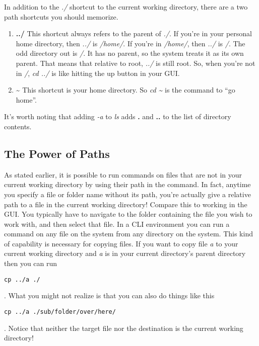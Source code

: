 \documentclass[nobib]{tufte-handout}
\begin{document}
In addition to the \textit{./} shortcut to the current working directory, there are a two path shortcuts you should memorize.
\begin{enumerate}
\item \textbf{../}  \newline
This shortcut always refers to the parent of \textit{./}.  If you're in your personal home directory, then \textit{../} is \textit{/home/}. If you're in \textit{/home/}, then \textit{../} is \textit{/}. The odd directory out is \textit{/}. It has no parent, so the system treats it as its own parent.  That means that relative to root, \textit{../} is still root.  So, when you're not in \textit{/}, \textit{cd ../} is like hitting the up button in your GUI\@.

\item \textbf{\textasciitilde} \newline
This shortcut is your home directory.  So \textit{cd \textasciitilde} is the command to ``go home''.
\end{enumerate}

It's worth noting that adding \textit{-a} to \textit{ls} adds \textbf{.} and \textbf{..} to the list of directory contents.

\subsection{The Power of Paths}

As stated earlier, it is possible to run commands on files that are not in your current working directory by using their path in the command.  In fact, anytime you specify a file or folder name without its path, you're actually give a relative path to a file in the current working directory! Compare this to working in the GUI\@. You typically have to navigate to the folder containing the file you wish to work with, and then select that file. In a CLI environment you can run a command on any file on the system from any directory on the system.  This kind of capability is necessary for copying files.  If you want to copy file \textit{a} to your current working directory and \textit{a} is in your current directory's parent directory then you can run \begin{verbatim}cp ../a ./\end{verbatim}.  What you might not realize is that you can also do things like this \begin{verbatim}cp ../a ./sub/folder/over/here/ \end{verbatim}.  Notice that neither the target file nor the destination is the current working directory!
\end{document}
